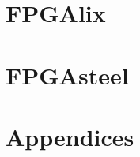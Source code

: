 \documentclass[a4paper,12pt]{book}
\begin{document}




\part{FPGAlix}


\part{FPGAsteel}


\appendix
\part{Appendices}

\end{document}
